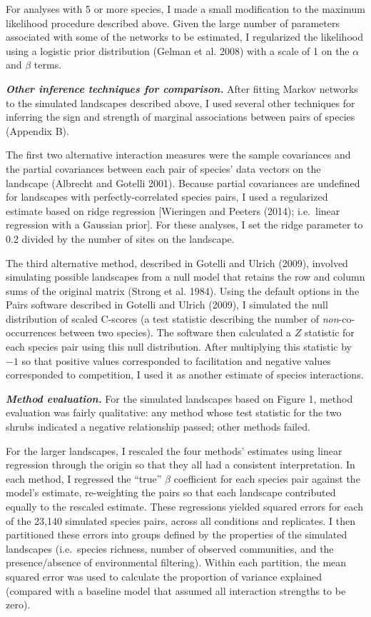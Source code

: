 \documentclass[12pt,]{article}
\begin{document}
\begin{spacing}{1.9}
\begin{flushleft}
For analyses with 5 or more species, I made a small modification to the
maximum likelihood procedure described above. Given the large number of
parameters associated with some of the networks to be estimated, I
regularized the likelihood using a logistic prior distribution (Gelman
et al. 2008) with a scale of 1 on the \(\alpha\) and \(\beta\) terms.

\textbf{\emph{Other inference techniques for comparison.}} After fitting
Markov networks to the simulated landscapes described above, I used
several other techniques for inferring the sign and strength of marginal
associations between pairs of species (Appendix B).

The first two alternative interaction measures were the sample
covariances and the partial covariances between each pair of species'
data vectors on the landscape (Albrecht and Gotelli 2001). Because
partial covariances are undefined for landscapes with
perfectly-correlated species pairs, I used a regularized estimate based
on ridge regression {[}Wieringen and Peeters (2014); i.e.~linear
regression with a Gaussian prior{]}. For these analyses, I set the ridge
parameter to 0.2 divided by the number of sites on the landscape.

The third alternative method, described in Gotelli and Ulrich (2009),
involved simulating possible landscapes from a null model that retains
the row and column sums of the original matrix (Strong et al. 1984).
Using the default options in the Pairs software described in Gotelli and
Ulrich (2009), I simulated the null distribution of scaled C-scores (a
test statistic describing the number of \emph{non}-co-occurrences
between two species). The software then calculated a \(Z\) statistic for
each species pair using this null distribution. After multiplying this
statistic by \(-1\) so that positive values corresponded to facilitation
and negative values corresponded to competition, I used it as another
estimate of species interactions.

\textbf{\emph{Method evaluation.}} For the simulated landscapes based on
Figure 1, method evaluation was fairly qualitative: any method whose
test statistic for the two shrubs indicated a negative relationship
passed; other methods failed.

For the larger landscapes, I rescaled the four methods' estimates using
linear regression through the origin so that they all had a consistent
interpretation. In each method, I regressed the ``true'' \(\beta\)
coefficient for each species pair against the model's estimate,
re-weighting the pairs so that each landscape contributed equally to the
rescaled estimate. These regressions yielded squared errors for each of
the 23,140 simulated species pairs, across all conditions and
replicates. I then partitioned these errors into groups defined by the
properties of the simulated landscapes (i.e.~species richness, number of
observed communities, and the presence/absence of environmental
filtering). Within each partition, the mean squared error was used to
calculate the proportion of variance explained (compared with a baseline
model that assumed all interaction strengths to be zero).


\end{flushleft}
\end{spacing}
\end{document}
